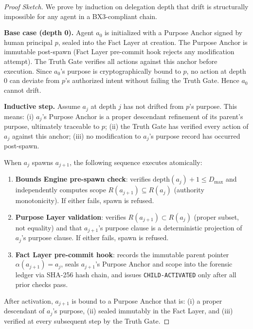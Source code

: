 \begin{proof}[Proof Sketch]
We prove by induction on delegation depth that drift is structurally impossible for any agent in a BX3-compliant chain.

\bigskip
\noindent\textbf{Base case (depth 0).} Agent $a_0$ is initialized with a Purpose Anchor signed by human principal $p$, sealed into the Fact Layer at creation. The Purpose Anchor is immutable post-spawn (Fact Layer pre-commit hook rejects any modification attempt). The Truth Gate verifies all actions against this anchor before execution. Since $a_0$'s purpose is cryptographically bound to $p$, no action at depth 0 can deviate from $p$'s authorized intent without failing the Truth Gate. Hence $a_0$ cannot drift.

\bigskip
\noindent\textbf{Inductive step.} Assume $a_j$ at depth $j$ has not drifted from $p$'s purpose. This means: (i) $a_j$'s Purpose Anchor is a proper descendant refinement of its parent's purpose, ultimately traceable to $p$; (ii) the Truth Gate has verified every action of $a_j$ against this anchor; (iii) no modification to $a_j$'s purpose record has occurred post-spawn.

When $a_j$ spawns $a_{j+1}$, the following sequence executes atomically:

\begin{enumerate}
  \item[(a)] \textbf{Bounds Engine pre-spawn check}: verifies $\mathrm{depth}(a_j) + 1 \leq D_{\max}$ and independently computes scope $R(a_{j+1}) \subseteq R(a_j)$ (authority monotonicity). If either fails, spawn is refused.
  \item[(b)] \textbf{Purpose Layer validation}: verifies $R(a_{j+1}) \subset R(a_j)$ (proper subset, not equality) and that $a_{j+1}$'s purpose clause is a deterministic projection of $a_j$'s purpose clause. If either fails, spawn is refused.
  \item[(c)] \textbf{Fact Layer pre-commit hook}: records the immutable parent pointer $\alpha(a_{j+1}) = a_j$, seals $a_{j+1}$'s Purpose Anchor and scope into the forensic ledger via SHA-256 hash chain, and issues \texttt{CHILD-ACTIVATED} only after all prior checks pass.
\end{enumerate}

After activation, $a_{j+1}$ is bound to a Purpose Anchor that is: (i) a proper descendant of $a_j$'s purpose, (ii) sealed immutably in the Fact Layer, and (iii) verified at every subsequent step by the Truth Gate.


\end{proof}
